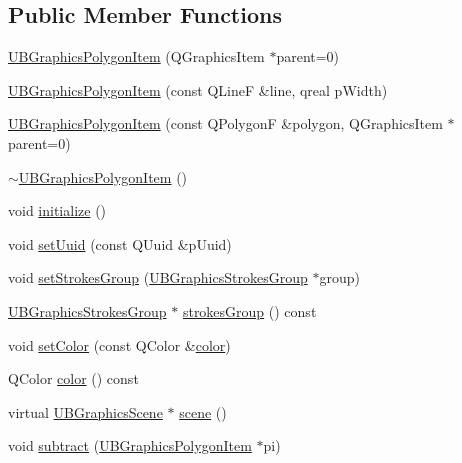 \subsection*{Public Member Functions}
\begin{DoxyCompactItemize}
\item 
\hyperlink{class_u_b_graphics_polygon_item_a88a4b88d048d776eafb97cdd2d979909}{U\-B\-Graphics\-Polygon\-Item} (Q\-Graphics\-Item $\ast$parent=0)
\item 
\hyperlink{class_u_b_graphics_polygon_item_a6f05fb4bda0b42fb66e96476d13b0f31}{U\-B\-Graphics\-Polygon\-Item} (const Q\-Line\-F \&line, qreal p\-Width)
\item 
\hyperlink{class_u_b_graphics_polygon_item_a8db7d5601dcaa0623d7b4810a2038d05}{U\-B\-Graphics\-Polygon\-Item} (const Q\-Polygon\-F \&polygon, Q\-Graphics\-Item $\ast$parent=0)
\item 
\hyperlink{class_u_b_graphics_polygon_item_a8f601cc855d1fd78dce23b99225f4e15}{$\sim$\-U\-B\-Graphics\-Polygon\-Item} ()
\item 
void \hyperlink{class_u_b_graphics_polygon_item_a2f069d5cdee13da2363e1c7c353f6994}{initialize} ()
\item 
void \hyperlink{class_u_b_graphics_polygon_item_a97f0b29bd07773c31b351da735b82efd}{set\-Uuid} (const Q\-Uuid \&p\-Uuid)
\item 
void \hyperlink{class_u_b_graphics_polygon_item_a81c74965973558c5c9b1caa82021a08e}{set\-Strokes\-Group} (\hyperlink{class_u_b_graphics_strokes_group}{U\-B\-Graphics\-Strokes\-Group} $\ast$group)
\item 
\hyperlink{class_u_b_graphics_strokes_group}{U\-B\-Graphics\-Strokes\-Group} $\ast$ \hyperlink{class_u_b_graphics_polygon_item_a87013167bd29d82e3b5dd7a40edd0546}{strokes\-Group} () const 
\item 
void \hyperlink{class_u_b_graphics_polygon_item_a7a9f3b6814099ead59d91e37d01e70d5}{set\-Color} (const Q\-Color \&\hyperlink{class_u_b_graphics_polygon_item_a9280bf7621aa90fe3f589d061b5a0af3}{color})
\item 
Q\-Color \hyperlink{class_u_b_graphics_polygon_item_a9280bf7621aa90fe3f589d061b5a0af3}{color} () const 
\item 
virtual \hyperlink{class_u_b_graphics_scene}{U\-B\-Graphics\-Scene} $\ast$ \hyperlink{class_u_b_graphics_polygon_item_af7ecdc68fa4901afd6720eb8d987e947}{scene} ()
\item 
void \hyperlink{class_u_b_graphics_polygon_item_a116ec58a26fc3d1ad0a99671cf00c212}{subtract} (\hyperlink{class_u_b_graphics_polygon_item}{U\-B\-Graphics\-Polygon\-Item} $\ast$pi)

\end{DoxyCompactItemize}
